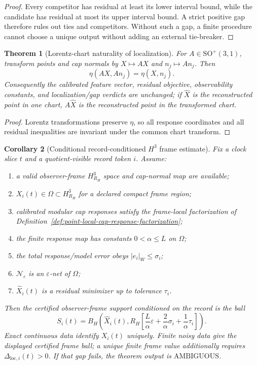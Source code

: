 \documentclass[11pt]{article}
\newtheorem{theorem}{Theorem}[section]
\newtheorem{corollary}[theorem]{Corollary}
\begin{document}
\begin{proof}
Every competitor has residual at least its lower interval bound, while the
candidate has residual at most its upper interval bound. A strict positive gap
therefore rules out ties and competitors. Without such a gap, a finite
procedure cannot choose a unique output without adding an external tie-breaker.
\end{proof}

\begin{theorem}[Lorentz-chart naturality of localization]\label{thm:h3-localization-naturality}
For \(A\in\mathrm{SO}^+(3,1)\), transform points and cap normals by
\(X\mapsto AX\) and \(n_j\mapsto An_j\). Then
\[
\eta(AX,An_j)=\eta(X,n_j).
\]
Consequently the calibrated feature vector, residual objective, observability
constants, and localization/gap verdicts are unchanged; if \(\widehat X\) is
the reconstructed point in one chart, \(A\widehat X\) is the reconstructed
point in the transformed chart.
\end{theorem}

\begin{proof}
Lorentz transformations preserve \(\eta\), so all response coordinates and all
residual inequalities are invariant under the common chart transform.
\end{proof}

\begin{corollary}[Conditional record-conditioned \(H^3\) frame estimate]
\label{cor:conditional-record-populated-h3}
Fix a clock slice \(t\) and a quotient-visible record token \(i\). Assume:
\begin{enumerate}[leftmargin=2em]
\item a valid observer-frame \(H^3_{R_H}\) space and cap-normal map are
available;
\item \(X_i(t)\in\Omega\subset H^3_{R_H}\) for a declared compact frame
region;
\item calibrated modular cap responses satisfy the frame-local factorization
of Definition~\ref{def:point-local-cap-response-factorization};
\item the finite response map has constants \(0<\alpha\leq L\) on \(\Omega\);
\item the total response/model error obeys \(|e_i|_W\leq\sigma_i\);
\item \(\mathcal N_\varepsilon\) is an \(\varepsilon\)-net of \(\Omega\);
\item \(\widehat X_i(t)\) is a residual minimizer up to tolerance \(\tau_i\).
\end{enumerate}
Then the certified observer-frame support conditioned on the record is the ball
\[
S_i(t)=B_H\!\left(\widehat X_i(t),
R_H\left[
\frac L\alpha\varepsilon+\frac2\alpha\sigma_i+\frac1\alpha\tau_i
\right]\right).
\]
Exact continuous data identify \(X_i(t)\) uniquely. Finite noisy data give the
displayed certified frame ball; a unique finite frame value additionally
requires \(\Delta_{\mathrm{loc},i}(t)>0\). If that gap fails, the theorem output
is \(\mathrm{AMBIGUOUS}\).
\end{corollary}
\end{document}
